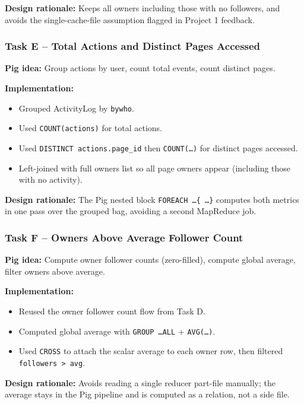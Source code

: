 \documentclass[11pt]{article}
\begin{document}
\textbf{Design rationale:} Keeps all owners including those with no followers, and avoids the single-cache-file assumption flagged in Project 1 feedback.

\subsubsection*{Task E -- Total Actions and Distinct Pages Accessed}

\textbf{Pig idea:} Group actions by user, count total events, count distinct pages.

\textbf{Implementation:}
\begin{itemize}[noitemsep,topsep=2pt]
  \item Grouped ActivityLog by \texttt{bywho}.
  \item Used \texttt{COUNT(actions)} for total actions.
  \item Used \texttt{DISTINCT actions.page\_id} then \texttt{COUNT(\ldots)} for distinct pages accessed.
  \item Left-joined with full owners list so all page owners appear (including those with no activity).
\end{itemize}

\textbf{Design rationale:} The Pig nested block \texttt{FOREACH \ldots \{ \ldots \}} computes both metrics in one pass over the grouped bag, avoiding a second MapReduce job.

\subsubsection*{Task F -- Owners Above Average Follower Count}

\textbf{Pig idea:} Compute owner follower counts (zero-filled), compute global average, filter owners above average.

\textbf{Implementation:}
\begin{itemize}[noitemsep,topsep=2pt]
  \item Reused the owner follower count flow from Task D.
  \item Computed global average with \texttt{GROUP \ldots ALL} + \texttt{AVG(\ldots)}.
  \item Used \texttt{CROSS} to attach the scalar average to each owner row, then filtered \texttt{followers > avg}.
\end{itemize}

\textbf{Design rationale:} Avoids reading a single reducer part-file manually; the average stays in the Pig pipeline and is computed as a relation, not a side file.
\end{document}
